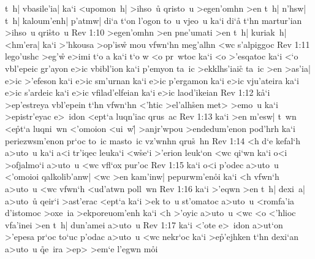 t~h|
vbasile'ia|
ka`i
<upomon~h|
>ihso~u\r{}
qristo~u
>egen'omhn
>en
t~h|
n'hsw|
t~h|
kaloum'enh|
p'atmw|
di`a
t`on
l'ogon
to~u
vjeo~u
ka`i
di`a\r{}
t`hn
martur'ian
>ihso~u
qri\r{s}to~u\bibvsend
{}
\vs Rev 1:10
>egen'omhn
>en
pne'umati
>en
t~h|
kuriak~h|
<hm'era|
ka`i
>'hkousa
>op'isw\r{}
mou
vfwn`hn
meg'alhn
<wc
s'alpiggoc\bibvsend
\vs Rev 1:11
lego'ushc
>eg'w\r{}
e>imi
t`o
a
ka`i
t`o
w
<o
pr~wtoc
ka`i
<o
>'esqatoc
ka`i
<`o
vbl'epeic
gr'ayon
e>ic
vbibl'ion
ka`i
p'emyon
ta~ic
>ekklhs'iaic\r{}
ta~ic
>en
>as'ia|
e>ic
>'efeson
ka`i
e>ic
sm'urnan
ka`i
e>ic
p'ergamon
ka`i
e>ic
vju'ateira
ka`i
e>ic
s'ardeic
ka`i
e>ic
vfilad'elfeian
ka`i
e>ic
laod'ikeian\bibvsend
\vs Rev 1:12
k\r{a}`i
>ep'estreya
vbl'epein
t`hn
vfwn`hn
<'htic
>el'alh\r{s}en
met>
>emo~u
ka`i
>epistr'eyac
e>~idon
<ept`a
luqn'iac
qrus~ac\bibvsend
\vs Rev 1:13
ka`i
>en
m'esw|
t~wn
<e\r{p}t`a
luqni~wn
<'omoion
<ui~w|\r{}
>anjr'wpou
>endedum'enon
pod'hrh
ka`i
periezwsm'enon
pr`oc
to~ic
masto~ic
vz'wnhn
qru\r{s}~hn\bibvsend
{}
\vs Rev 1:14
<h
d`e
kefal`h
a>uto~u
ka`i
a<i
tr'iqec
leuka`i
<w\r{s}e`i
>'erion
leuk`on
<wc
qi`wn
ka`i
o<i
>ofjalmo`i
a>uto~u
<wc
vfl`ox
pur'oc\bibvsend
\vs Rev 1:15
ka`i
o<i
p'odec
a>uto~u
<'omoioi
qalkolib'anw|
<wc
>en
kam'inw|
pepurwm'en\r{o}i
ka`i
<h
vfwn`h
a>uto~u
<wc
vfwn`h
<ud'atwn
poll~wn\bibvsend
\vs Rev 1:16
ka`i
>'eqwn
>en
t~h|
dexi~a|
a>uto~u\r{}
qeir`i
>ast'erac
<ept`a
ka`i
>ek
to~u
st'omatoc
a>uto~u
<romfa'ia
d'istomoc
>oxe~ia
>ekporeuom'enh
ka`i
<h
>'oyic
a>uto~u
<wc
<o
<'hlioc
vfa'inei
>en
t~h|
dun'amei
a>uto~u\bibvsend
\vs Rev 1:17
ka`i
<'ote
e>~idon
a>ut`on
>'epesa
pr`oc
to`uc
p'odac
a>uto~u
<wc
nekr`oc
ka`i
>e\r{p}'ejhken
t`hn
dexi`an
a>uto~u
\r{q}e~ira
>ep>
>em`e
l'egwn
m\r{o}i
